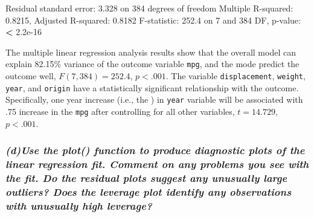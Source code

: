 \documentclass[
]{article}
\newenvironment{Shaded}{\begin{snugshade}}{\end{snugshade}}
\newcommand{\DecValTok}[1]{\textcolor[rgb]{0.00,0.00,0.81}{#1}}
\newcommand{\ErrorTok}[1]{\textcolor[rgb]{0.64,0.00,0.00}{\textbf{#1}}}
\newcommand{\FloatTok}[1]{\textcolor[rgb]{0.00,0.00,0.81}{#1}}
\newcommand{\NormalTok}[1]{#1}
\newcommand{\SpecialCharTok}[1]{\textcolor[rgb]{0.00,0.00,0.00}{#1}}
\begin{document}
\begin{Shaded}
\begin{Highlighting}[]
\NormalTok{Residual standard error}\SpecialCharTok{:} \FloatTok{3.328}\NormalTok{ on }\DecValTok{384}\NormalTok{ degrees of freedom}
\NormalTok{Multiple R}\SpecialCharTok{{-}}\NormalTok{squared}\SpecialCharTok{:}  \FloatTok{0.8215}\NormalTok{,    Adjusted R}\SpecialCharTok{{-}}\NormalTok{squared}\SpecialCharTok{:}  \FloatTok{0.8182} 
\NormalTok{F}\SpecialCharTok{{-}}\NormalTok{statistic}\SpecialCharTok{:} \FloatTok{252.4}\NormalTok{ on }\DecValTok{7}\NormalTok{ and }\DecValTok{384}\NormalTok{ DF,  p}\SpecialCharTok{{-}}\NormalTok{value}\SpecialCharTok{:} \ErrorTok{\textless{}} \FloatTok{2.2e{-}16}
\end{Highlighting}
\end{Shaded}

The multiple linear regression analysis results show that the overall
model can explain 82.15\% variance of the outcome variable \texttt{mpg},
and the mode predict the outcome well, \(F(7,384)=252.4\), \(p < .001\).
The variable \texttt{displacement}, \texttt{weight}, \texttt{year}, and
\texttt{origin} have a statistically significant relationship with the
outcome. Specifically, one year increase (i.e., the ) in \texttt{year}
variable will be associated with .75 increase in the \texttt{mpg} after
controlling for all other variables, \(t = 14.729\), \(p <.001\).

\hypertarget{duse-the-plot-function-to-produce-diagnostic-plots-of-the-linear-regression-fit.-comment-on-any-problems-you-see-with-the-fit.-do-the-residual-plots-suggest-any-unusually-large-outliers-does-the-leverage-plot-identify-any-observations-with-unusually-high-leverage}{%
\subsubsection{\texorpdfstring{\emph{(d)Use the plot() function to
produce diagnostic plots of the linear regression fit. Comment on any
problems you see with the fit. Do the residual plots suggest any
unusually large outliers? Does the leverage plot identify any
observations with unusually high
leverage?}}{(d)Use the plot() function to produce diagnostic plots of the linear regression fit. Comment on any problems you see with the fit. Do the residual plots suggest any unusually large outliers? Does the leverage plot identify any observations with unusually high leverage?}}\label{duse-the-plot-function-to-produce-diagnostic-plots-of-the-linear-regression-fit.-comment-on-any-problems-you-see-with-the-fit.-do-the-residual-plots-suggest-any-unusually-large-outliers-does-the-leverage-plot-identify-any-observations-with-unusually-high-leverage}}
\end{document}
